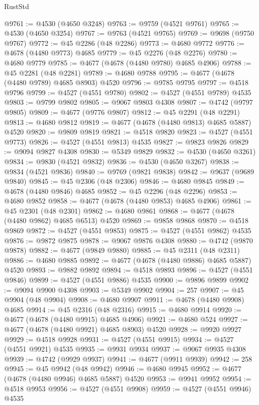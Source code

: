 \begin{lexlean}{RustStd}
\begin{coremodule}
@9761 := @4530 (@4650 @3248)
@9763 := @9759 (@4521 @9761)
@9765 := @4530 (@4650 @3254)
@9767 := @9763 (@4521 @9765)
@9769 := @9698 (@9750 @9767)
@9772 := @45 @2286 (@48 @2286)
@9773 := @4680 @9772
@9776 := @4678 (@4480 @9773) @4685
@9779 := @45 @2276 (@48 @2276)
@9780 := @4680 @9779
@9785 := @4677 (@4678 (@4480 @9780) @4685 @4906)
@9788 := @45 @2281 (@48 @2281)
@9789 := @4680 @9788
@9795 := @4677 (@4678 (@4480 @9789) @4685 @8903) @4520
@9796 := @9785 @9795
@9797 := @4518 @9796
@9799 := @4527 (@4551 @9780)
@9802 := @4527 (@4551 @9789) @4535
@9803 := @9799 @9802
@9805 := @9067 @9803 @4308
@9807 := @4742 (@9797 @9805)
@9809 := @4677 (@9776 @9807)
@9812 := @45 @2291 (@48 @2291)
@9813 := @4680 @9812
@9819 := @4677 (@4678 (@4480 @9813) @4685 @5887) @4520
@9820 := @9809 @9819
@9821 := @4518 @9820
@9823 := @4527 (@4551 @9773)
@9826 := @4527 (@4551 @9813) @4535
@9827 := @9823 @9826
@9829 := @9094 @9827 @4308
@9830 := @5349 @9829
@9832 := @4530 (@4650 @3261)
@9834 := @9830 (@4521 @9832)
@9836 := @4530 (@4650 @3267)
@9838 := @9834 (@4521 @9836)
@9840 := @9769 (@9821 @9838)
@9842 := @9637 (@9689 @9840)
@9845 := @45 @2306 (@48 @2306)
@9846 := @4680 @9845
@9849 := @4678 (@4480 @9846) @4685
@9852 := @45 @2296 (@48 @2296)
@9853 := @4680 @9852
@9858 := @4677 (@4678 (@4480 @9853) @4685 @4906)
@9861 := @45 @2301 (@48 @2301)
@9862 := @4680 @9861
@9868 := @4677 (@4678 (@4480 @9862) @4685 @6513) @4520
@9869 := @9858 @9868
@9870 := @4518 @9869
@9872 := @4527 (@4551 @9853)
@9875 := @4527 (@4551 @9862) @4535
@9876 := @9872 @9875
@9878 := @9067 @9876 @4308
@9880 := @4742 (@9870 @9878)
@9882 := @4677 (@9849 @9880)
@9885 := @45 @2311 (@48 @2311)
@9886 := @4680 @9885
@9892 := @4677 (@4678 (@4480 @9886) @4685 @5887) @4520
@9893 := @9882 @9892
@9894 := @4518 @9893
@9896 := @4527 (@4551 @9846)
@9899 := @4527 (@4551 @9886) @4535
@9900 := @9896 @9899
@9902 := @9094 @9900 @4308
@9903 := @5349 @9902
@9904 := 257
@9907 := @45 @9904 (@48 @9904)
@9908 := @4680 @9907
@9911 := @4678 (@4480 @9908) @4685
@9914 := @45 @2316 (@48 @2316)
@9915 := @4680 @9914
@9920 := @4677 (@4678 (@4480 @9915) @4685 @4906)
@9921 := @4680 @524
@9927 := @4677 (@4678 (@4480 @9921) @4685 @8903) @4520
@9928 := @9920 @9927
@9929 := @4518 @9928
@9931 := @4527 (@4551 @9915)
@9934 := @4527 (@4551 @9921) @4535
@9935 := @9931 @9934
@9937 := @9067 @9935 @4308
@9939 := @4742 (@9929 @9937)
@9941 := @4677 (@9911 @9939)
@9942 := 258
@9945 := @45 @9942 (@48 @9942)
@9946 := @4680 @9945
@9952 := @4677 (@4678 (@4480 @9946) @4685 @5887) @4520
@9953 := @9941 @9952
@9954 := @4518 @9953
@9956 := @4527 (@4551 @9908)
@9959 := @4527 (@4551 @9946) @4535

\end{coremodule}
\end{lexlean}
